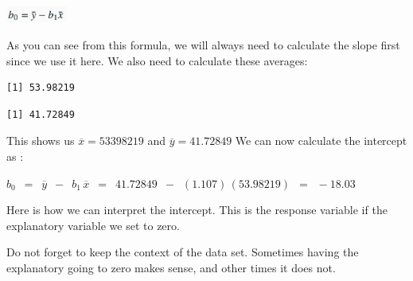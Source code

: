 \documentclass[
  letterpaper,
  DIV=11,
  numbers=noendperiod]{scrreprt}
\newenvironment{Shaded}{\begin{snugshade}}{\end{snugshade}}
\newcommand{\CommentTok}[1]{\textcolor[rgb]{0.37,0.37,0.37}{#1}}
\newcommand{\FunctionTok}[1]{\textcolor[rgb]{0.28,0.35,0.67}{#1}}
\newcommand{\NormalTok}[1]{\textcolor[rgb]{0.00,0.23,0.31}{#1}}
\newcommand{\OtherTok}[1]{\textcolor[rgb]{0.00,0.23,0.31}{#1}}
\newcommand{\SpecialCharTok}[1]{\textcolor[rgb]{0.37,0.37,0.37}{#1}}
\begin{document}
\includegraphics[width=0.15\textwidth,height=\textheight]{./images/LMR_5.jpg}

As you can see from this formula, we will always need to calculate the
slope first since we use it here. We also need to calculate these
averages:

\begin{Shaded}
\end{Shaded}

\begin{verbatim}
[1] 53.98219
\end{verbatim}

\begin{Shaded}
\end{Shaded}

\begin{verbatim}
[1] 41.72849
\end{verbatim}

This shows us \(\overline{x} = 53398219\) and
\(\overline{y} = 41.72849\) We can now calculate the intercept as :

\(\displaystyle{b_0\,\,\, = \,\,\, \overline{y} \,\,\, -\,\,\,b_1 \,
\overline{x}\,\,\, =\,\,\, 41.72849\,\,\, - \,\,\, (1.107)\,(53.98219)\,\,\, =
\,\,\,-18.03}\)

\begin{tcolorbox}[enhanced jigsaw, colbacktitle=quarto-callout-tip-color!10!white, colframe=quarto-callout-tip-color-frame, opacitybacktitle=0.6, rightrule=.15mm, title=\textcolor{quarto-callout-tip-color}{\faLightbulb}\hspace{0.5em}{Interpreting the Intercept}, colback=white, coltitle=black, breakable, leftrule=.75mm, toptitle=1mm, bottomrule=.15mm, opacityback=0, bottomtitle=1mm, titlerule=0mm, left=2mm, toprule=.15mm, arc=.35mm]

Here is how we can interpret the intercept. This is the response
variable if the explanatory variable we set to zero.

Do not forget to keep the context of the data set. Sometimes having the
explanatory going to zero makes sense, and other times it does not.

\end{tcolorbox}
\end{document}
